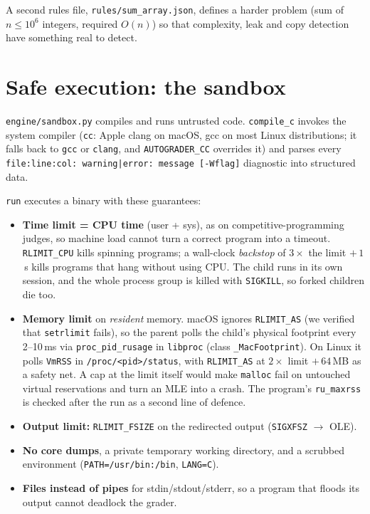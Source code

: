 \documentclass[11pt,a4paper]{article}
\newcommand{\file}[1]{\nolinkurl{#1}}
\newcommand{\fn}[1]{\nolinkurl{#1}}
\begin{document}
A second rules file, \file{rules/sum_array.json}, defines a harder problem (sum of $n \le 10^6$ integers,
required $O(n)$) so that complexity, leak and copy detection have something real to detect.

\section{Safe execution: the sandbox}
\file{engine/sandbox.py} compiles and runs untrusted code. \fn{compile_c} invokes the system compiler
(\texttt{cc}: Apple clang on macOS, gcc on most Linux distributions; it falls back to \texttt{gcc} or \texttt{clang},
and \texttt{AUTOGRADER\_CC} overrides it) and parses every
\texttt{file:line:col: warning|error: message [-Wflag]} diagnostic into structured data.

\fn{run} executes a binary with these guarantees:
\begin{itemize}
  \item \textbf{Time limit = CPU time} (user + sys), as on competitive-programming judges, so machine load cannot
        turn a correct program into a timeout. \texttt{RLIMIT\_CPU} kills spinning programs; a wall-clock
        \emph{backstop} of $3\times$ the limit $+\,1$\,s kills programs that hang without using CPU. The child runs in
        its own session, and the whole process group is killed with \texttt{SIGKILL}, so forked children die too.
  \item \textbf{Memory limit} on \emph{resident} memory. macOS ignores \texttt{RLIMIT\_AS} (we verified that
        \fn{setrlimit} fails), so the parent polls the child's physical footprint every 2--10\,ms via
        \fn{proc_pid_rusage} in \texttt{libproc} (class \fn{_MacFootprint}). On Linux it polls \texttt{VmRSS} in
        \file{/proc/<pid>/status}, with \texttt{RLIMIT\_AS} at $2\times$ limit $+\,64$\,MB as a safety net. A cap at the
        limit itself would make \texttt{malloc} fail on untouched virtual reservations and turn an MLE into a crash.
        The program's \texttt{ru\_maxrss} is checked after the run as a second line of defence.
  \item \textbf{Output limit:} \texttt{RLIMIT\_FSIZE} on the redirected output (\texttt{SIGXFSZ} $\rightarrow$ OLE).
  \item \textbf{No core dumps}, a private temporary working directory, and a scrubbed environment
        (\texttt{PATH=/usr/bin:/bin}, \texttt{LANG=C}).
  \item \textbf{Files instead of pipes} for stdin/stdout/stderr, so a program that floods its output cannot
        deadlock the grader.
\end{itemize}
\end{document}
